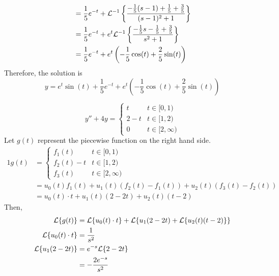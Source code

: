 \documentclass[diffeq.tex]{subfiles}
\begin{document}
\begin{example}
\begin{alignat}{1}
            &= \frac{1}{5}e^{-t} + \mathcal{L}^{-1}\left\{\frac{-\frac{1}{5}(s - 1) + \frac{1}{5} + \frac{3}{5}}{(s - 1)^{2} + 1}\right\}\\
            &= \frac{1}{5}e^{-t} + e^{t}\mathcal{L}^{-1}\left\{\frac{-\frac{1}{5}s - \frac{1}{5}+ \frac{3}{5}}{s^{2} + 1}\right\}\\
            &= \frac{1}{5}e^{-t} + e^{t}\left(-\frac{1}{5}\cos(t) + \frac{2}{5}\sin(t)\right)
        \end{alignat}
        Therefore, the solution is
        \begin{equation}
            y = e^{t}\sin(t) + \frac{1}{5}e^{-t} + e^{t}\left(-\frac{1}{5}\cos(t) + \frac{2}{5}\sin(t)\right)
        \end{equation}
    \end{example}
    \begin{example}
        \begin{equation}
            y'' + 4y = \begin{cases}
                t & t \in [0, 1)\\
                2 - t & t \in [1, 2)\\
                0 & t \in [2, \infty)
            \end{cases}
        \end{equation}
        Let $g(t)$ represent the piecewise function on the right hand side.
        \begin{alignat}{1}
            g(t) &= \begin{cases}
                f_{1}(t) & t \in [0, 1)\\
                f_{2}(t) - t & t \in [1, 2)\\
                f_{3}(t) & t \in [2, \infty)
            \end{cases}\\
            &= u_{0}(t)f_{1}(t) + u_{1}(t)\left(f_{2}(t) - f_{1}(t)\right) + u_{2}(t)\left(f_{3}(t) - f_{2}(t)\right)\\
            &= u_{0}(t)\cdot t + u_{1}(t)(2 - 2t) + u_{2}(t)(t - 2)
        \end{alignat}
        Then,
        \begin{alignat}{1}
            \lp{g(t)} &= \lp{u_{0}(t)\cdot t} + \lp{u_{1}(2 - 2t) + \lp{u_{2}(t)(t - 2)}}\\
            \lp{u_{0}(t)\cdot t} &= \frac{1}{s^{2}}\\
            \lp{u_{1}(2 - 2t)} &= e^{-s}\lp{2-2t}\\
            &= -\frac{2e^{-s}}{s^{2}}\\

\end{alignat}
\end{example}
\end{document}
